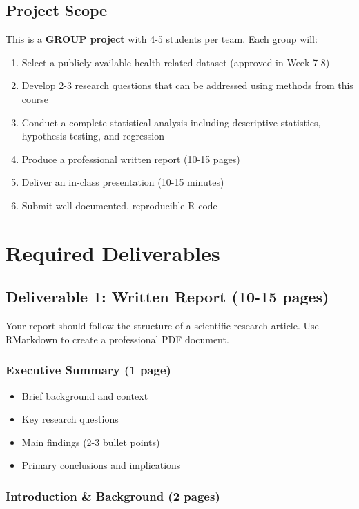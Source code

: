 \documentclass[11pt]{article}
\begin{document}
\subsection{Project Scope}

This is a \textbf{GROUP project} with 4-5 students per team. Each group will:

\begin{enumerate}
\item Select a publicly available health-related dataset (approved in Week 7-8)
\item Develop 2-3 research questions that can be addressed using methods from this course
\item Conduct a complete statistical analysis including descriptive statistics, hypothesis testing, and regression
\item Produce a professional written report (10-15 pages)
\item Deliver an in-class presentation (10-15 minutes)
\item Submit well-documented, reproducible R code
\end{enumerate}

\section{Required Deliverables}

\subsection{Deliverable 1: Written Report (10-15 pages)}

Your report should follow the structure of a scientific research article. Use RMarkdown to create a professional PDF document.

\subsubsection{Executive Summary (1 page)}

\begin{itemize}
\item Brief background and context
\item Key research questions
\item Main findings (2-3 bullet points)
\item Primary conclusions and implications
\end{itemize}

\subsubsection{Introduction \& Background (2 pages)}
\end{document}
